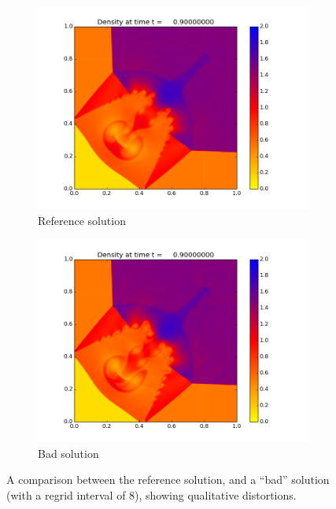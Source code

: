 \documentclass[11pt]{article}
\begin{document}
\begin{figure}[!htb]
\centering
	\begin{subfigure}[b]{0.75\textwidth}
		\caption{Reference solution}
		\includegraphics[width=\textwidth]{images/euler_base_t9}
	\end{subfigure}
	
	\begin{subfigure}[b]{0.75\textwidth}
		\caption{Bad solution}
		\includegraphics[width=\textwidth]{images/euler_bad_t9}
	\end{subfigure}
	\caption{A comparison between the reference solution, and a ``bad''
	solution (with a regrid interval of 8), showing qualitative distortions.}
	\label{fig:euler_bad_soln}
\end{figure}
\end{document}

